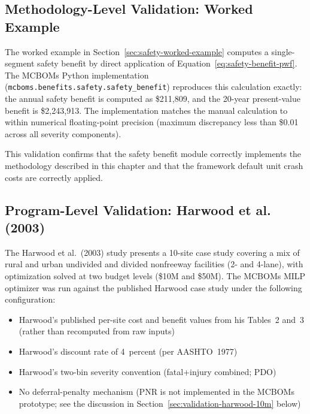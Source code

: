 \subsection{Methodology-Level Validation: Worked Example}
\label{sec:validation-worked}

The worked example in Section~\ref{sec:safety-worked-example} computes a
single-segment safety benefit by direct application of
Equation~\ref{eq:safety-benefit-pwf}. The MCBOMs Python implementation
(\texttt{mcboms.benefits.safety.safety\_benefit}) reproduces this calculation
exactly: the annual safety benefit is computed as \$211{,}809, and the
20-year present-value benefit is \$2{,}243{,}913. The implementation
matches the manual calculation to within numerical floating-point precision
(maximum discrepancy less than \$0.01 across all severity components).

This validation confirms that the safety benefit module correctly implements
the methodology described in this chapter and that the framework default
unit crash costs are correctly applied.

\subsection{Program-Level Validation: Harwood et al. (2003)}
\label{sec:validation-harwood}

The Harwood et al.~(2003) study presents a 10-site case study covering a mix
of rural and urban undivided and divided nonfreeway facilities (2- and
4-lane), with optimization solved at two budget levels (\$10M and \$50M).
The MCBOMs MILP optimizer was run against the published Harwood case study
under the following configuration:

\begin{itemize}[leftmargin=2em, itemsep=2pt]
  \item Harwood's published per-site cost and benefit values from his
    Tables~2 and~3 (rather than recomputed from raw inputs)
  \item Harwood's discount rate of 4~percent (per AASHTO~1977)
  \item Harwood's two-bin severity convention (fatal+injury combined; PDO)
  \item No deferral-penalty mechanism (PNR is not implemented in the MCBOMs
    prototype; see the discussion in Section~\ref{sec:validation-harwood-10m}
    below)
\end{itemize}

